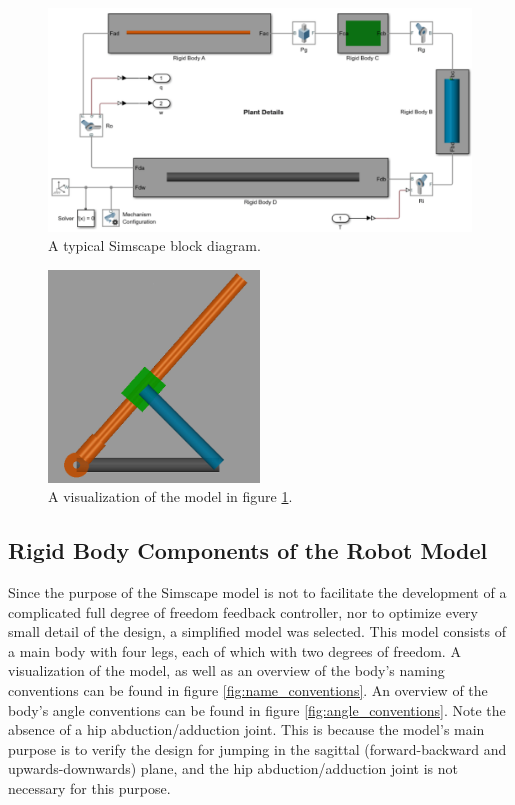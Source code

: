 \begin{figure}
    \centering
    \includegraphics[width=\textwidth]{Images/simscape_tutorial_diagram.png}
    \caption{A typical Simscape block diagram.}
    \label{fig:simscape_tutorial_diagram}
\end{figure}
\begin{figure}
    \centering
    \includegraphics[width=0.5\textwidth]{Images/simscape_tutorial_visualization.png}
    \caption{A visualization of the model in figure \ref{fig:simscape_tutorial_diagram}.}
    \label{fig:simscape_tutorial_visualization}
\end{figure}

\subsection{Rigid Body Components of the Robot Model}
\label{sec:robot_main_parts}

Since the purpose of the Simscape model is not to facilitate the development of a complicated full degree of freedom feedback controller, nor to optimize every small detail of the design, a simplified model was selected. This model consists of a main body with four legs, each of which with two degrees of freedom. A visualization of the model, as well as an overview of the body's naming conventions can be found in figure \ref{fig:name_conventions}. An overview of the body's angle conventions can be found in figure \ref{fig:angle_conventions}. Note the absence of a hip abduction/adduction joint. This is because the model's main purpose is to verify the design for jumping in the sagittal (forward-backward and upwards-downwards) plane, and the hip abduction/adduction joint is not necessary for this purpose.

